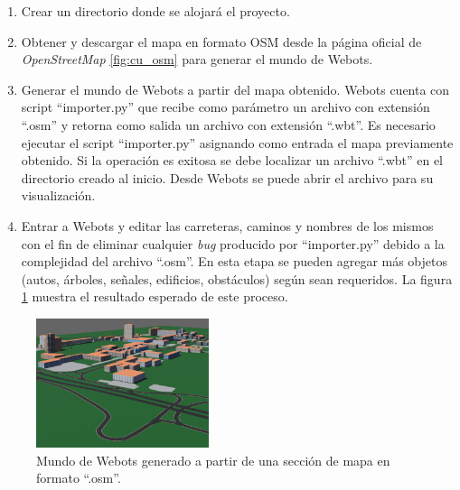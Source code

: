 \begin{enumerate}
    \item Crear un directorio donde se alojará el proyecto.
    \item Obtener y descargar el mapa en formato OSM desde la página oficial de \textit{OpenStreetMap} \ref{fig:cu_osm} para generar el mundo de Webots.  
    
    \item Generar el mundo de Webots a partir del mapa obtenido. Webots cuenta con script ``importer.py'' que recibe como parámetro un archivo con extensión ``.osm'' y retorna como salida un archivo con extensión ``.wbt''. Es necesario ejecutar el script ``importer.py'' asignando como entrada el mapa previamente obtenido. Si la operación es exitosa se debe localizar un archivo ``.wbt'' en el directorio creado al inicio. Desde Webots se puede abrir el archivo para su visualización.
    
    \item Entrar a Webots y editar las carreteras, caminos y nombres de los mismos con el fin de eliminar cualquier \textit{bug} producido por ``importer.py'' debido a la complejidad del archivo ``.osm''. En esta etapa se pueden agregar más objetos (autos, árboles, señales, edificios, obstáculos) según sean requeridos. La figura \ref{fig:cu_wbt} muestra el resultado esperado de este proceso.
\end{enumerate}
\begin{figure}[h]
    \centering
    \includegraphics[width=0.45\textwidth]{Figures/Figures_Cap03/cu_wbt.png}
    \caption{Mundo de Webots generado a partir de una sección de mapa en formato ``.osm''.}
    \label{fig:cu_wbt}
\end{figure}



